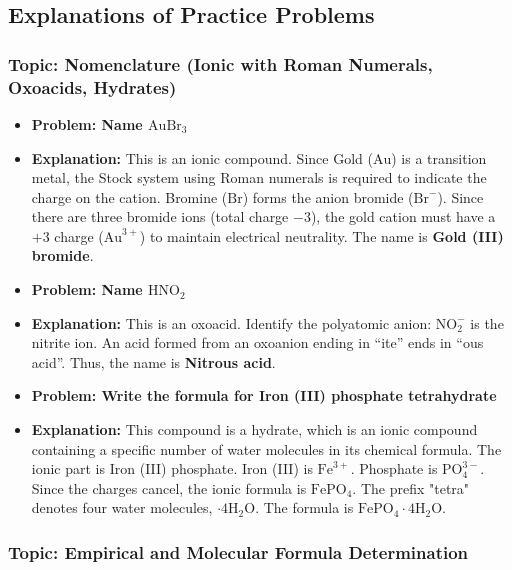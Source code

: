 \documentclass{article}
\begin{document}
\bigskip %

\subsection*{Explanations of Practice Problems}

\subsubsection*{Topic: Nomenclature (Ionic with Roman Numerals, Oxoacids, Hydrates)}

\begin{itemize}
    \item \textbf{Problem: Name $\text{AuBr}_3$}
    \item \textbf{Explanation:} This is an ionic compound. Since Gold ($\text{Au}$) is a transition metal, the Stock system using Roman numerals is required to indicate the charge on the cation. Bromine ($\text{Br}$) forms the anion bromide ($\text{Br}^-$). Since there are three bromide ions (total charge $-3$), the gold cation must have a $+3$ charge ($\text{Au}^{3+}$) to maintain electrical neutrality. The name is \textbf{Gold (III) bromide}.

    \item \textbf{Problem: Name $\text{HNO}_2$}
    \item \textbf{Explanation:} This is an oxoacid. Identify the polyatomic anion: $\text{NO}_2^-$ is the nitrite ion. An acid formed from an oxoanion ending in ``ite'' ends in ``ous acid''. Thus, the name is \textbf{Nitrous acid}.

    \item \textbf{Problem: Write the formula for Iron (III) phosphate tetrahydrate}
    \item \textbf{Explanation:} This compound is a hydrate, which is an ionic compound containing a specific number of water molecules in its chemical formula. The ionic part is Iron (III) phosphate. Iron (III) is $\text{Fe}^{3+}$. Phosphate is $\text{PO}_4^{3-}$. Since the charges cancel, the ionic formula is $\text{FePO}_4$. The prefix "tetra" denotes four water molecules, $\cdot 4\text{H}_2\text{O}$. The formula is \textbf{$\text{FePO}_4 \cdot 4\text{H}_2\text{O}$}.
\end{itemize}

\bigskip %

\subsubsection*{Topic: Empirical and Molecular Formula Determination}
\end{document}
